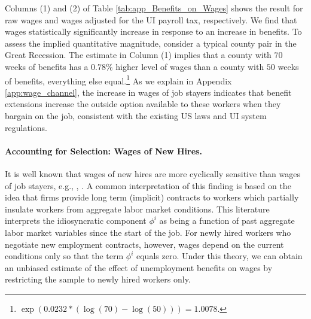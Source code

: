 \documentclass[12pt]{article}
\newcommand{\1}{\mathbf{1}}
\begin{document}
\begin{appendix}
Columns (1) and (2) of Table \ref{tab:app_Benefits_on_Wages} shows the result for raw wages and wages adjusted for the UI payroll tax, respectively. We find that wages statistically significantly increase in response to an increase in benefits. To assess the implied quantitative magnitude, consider a typical county pair in the Great Recession. The estimate in Column (1) implies that a county with $70$ weeks of benefits has a $0.78\%$ higher level of wages than a county with $50$ weeks of benefits, everything else equal.\footnote{$\exp(0.0232*(\log(70)-\log(50)))
= 1.0078.$} As we explain in Appendix \ref{app:wage_channel}, the increase in wages of job stayers indicates that benefit extensions increase the outside option available to these workers when they bargain on the job, consistent with the existing US laws and UI system regulations.

\begin{table}[t]
  \centering
   \caption{Unemployment Benefit Extensions and Wages} \label{tab:app_Benefits_on_Wages}
\small

\vspace{-0.2cm}
\end{table}



\paragraph{Accounting for Selection: Wages of New Hires.}
It is well known that wages of new hires are more cyclically sensitive than wages of job stayers, e.g., \citet{haefke+sonntag+vanrens:12}, \citet{pissarides:09}. A common interpretation of this finding is based on the idea that firms provide long term (implicit) contracts to workers which partially insulate workers from aggregate labor market conditions. This literature interprets the idiosyncratic component $\phi^i$ as being a function of past aggregate labor market variables since the start of the job. For newly hired workers who negotiate new employment contracts, however, wages depend on the current conditions only so that the term $\phi^i$ equals zero. Under this theory, we can obtain an unbiased estimate of the effect of unemployment benefits on wages by restricting the sample to newly hired workers only.


\end{appendix}
\end{document}
